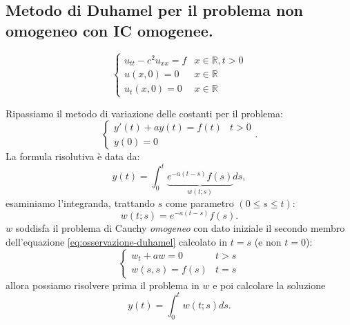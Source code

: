 \documentclass[10pt,a4paper,twoside,openright]{book}
\begin{document}
\subsection{Metodo di Duhamel per il problema non omogeneo con IC omogenee.}
\begin{equation}
	\begin{cases}
		u_{tt} -c^{2} u_{xx} =f & x\in \mathbb{R} ,t >0 \\
		u( x,0) =0          & x\in \mathbb{R}       \\
		u_{t}( x,0) =0      & x\in \mathbb{R}       
	\end{cases}
\end{equation}
\begin{oss}
	Ripassiamo il metodo di variazione delle costanti per il problema:
	\begin{equation*}
		\begin{cases}
			y'( t) +ay( t) =f( t) & t >0 \\
			y( 0) =0              &      
		\end{cases} .
	\end{equation*}
	La formula risolutiva è data da:
	\begin{equation*}
		y( t) =\int _{0}^{t}\underbrace{e^{-a( t-s)} f( s)}_{w( t;s)} ds,
	\end{equation*}
	esaminiamo l'integranda, trattando $\displaystyle s$ come parametro $\displaystyle ( 0\leqslant s\leqslant t)$:
	\begin{equation}
		w( t;s) =e^{-a( t-s)} f( s) .
		\label{eq:osservazione-duhamel}
	\end{equation}
	$\displaystyle w$ soddisfa il problema di Cauchy \textit{omogeneo} con dato iniziale il secondo membro dell'equazione \eqref{eq:osservazione-duhamel} calcolato in $\displaystyle t=s$ (e non $\displaystyle t=0$):
	\begin{equation*}
		\begin{cases}
			w_{t} +aw=0    & t >s \\
			w( s,s) =f( s) & t=s  
		\end{cases}
	\end{equation*}
	allora possiamo risolvere prima il problema in $\displaystyle w$ e poi calcolare la soluzione
	\begin{equation*}
		y( t) =\int _{0}^{t} w( t;s) ds.
	\end{equation*}
\end{oss}
\end{document}
